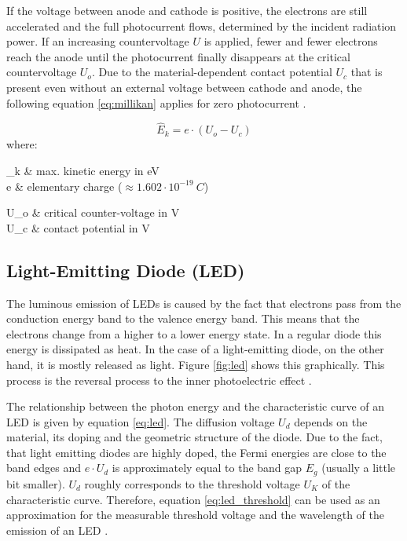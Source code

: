 If the voltage between anode and cathode is positive, the electrons are still accelerated and the full photocurrent flows, determined by the incident radiation power. If an increasing countervoltage $U$ is applied, fewer and fewer electrons reach the anode until the photocurrent finally disappears at the critical countervoltage $U_o$. Due to the material-dependent contact potential $U_c$ that is present even without an external voltage between cathode and anode, the following equation \ref{eq:millikan} applies for zero photocurrent \cite{light_quantum}.

\begin{equation}
\widehat{E}_k = e\cdot (U_o - U_c)
\label{eq:millikan}
\end{equation}
where:
\begin{multicols}{2}
	\begin{center}
		\begin{conditions}
			_k & max. kinetic energy in eV \\
			e & elementary charge ($\approx 1.602\cdot 10^{-19}\ \si{C}$)
		\end{conditions}
		\begin{conditions}
			U_o & critical counter-voltage in V \\
			U_c & contact potential in V
		\end{conditions}
	\end{center}
\end{multicols}

\newpage
\subsection{Light-Emitting Diode (LED)}
\label{subsec:light-emitting_diode}
The luminous emission of LEDs is caused by the fact that electrons pass from the conduction energy band to the valence energy band. This means that the electrons change from a higher to a lower energy state. In a regular diode this energy is dissipated as heat. In the case of a light-emitting diode, on the other hand, it is mostly released as light. Figure \ref{fig:led} shows this graphically. This process is the reversal process to the inner photoelectric effect \cite{light_quantum}.

The relationship between the photon energy and the characteristic curve of an LED is given by equation \ref{eq:led}. The diffusion voltage $U_d$ depends on the material, its doping and the geometric structure of the diode. Due to the fact, that light emitting diodes are highly doped, the Fermi energies are close to the band edges and $e\cdot U_d$ is approximately equal to the band gap $E_g$ (usually a little bit smaller). $U_d$ roughly corresponds to the threshold voltage $U_K$ of the characteristic curve. Therefore, equation \ref{eq:led_threshold} can be used as an approximation for the measurable threshold voltage and the wavelength of the emission of an LED \cite{light_quantum}.

